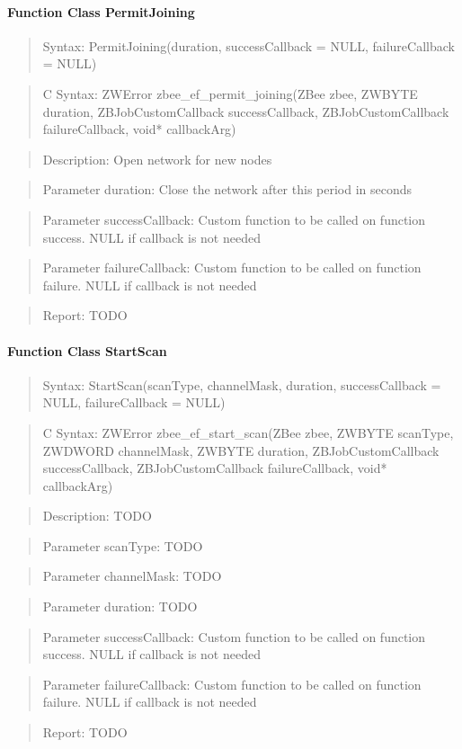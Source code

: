 \paragraph{Function Class PermitJoining}
\begin{quote}Syntax: PermitJoining(duration, successCallback = NULL, failureCallback = NULL)\end{quote}
\begin{quote}C Syntax: ZWError zbee\_ef\_permit\_joining(ZBee zbee, ZWBYTE duration, ZBJobCustomCallback successCallback, ZBJobCustomCallback failureCallback, void* callbackArg)\end{quote}
\begin{quote}Description: Open network for new nodes\end{quote}
\begin{quote}Parameter duration: Close the network after this period in seconds\end{quote}
\begin{quote}Parameter successCallback: Custom function to be called on function success. NULL if callback is not needed\end{quote}
\begin{quote}Parameter failureCallback: Custom function to be called on function failure. NULL if callback is not needed\end{quote}
\begin{quote}Report: TODO\end{quote}

\paragraph{Function Class StartScan}
\begin{quote}Syntax: StartScan(scanType, channelMask, duration, successCallback = NULL, failureCallback = NULL)\end{quote}
\begin{quote}C Syntax: ZWError zbee\_ef\_start\_scan(ZBee zbee, ZWBYTE scanType, ZWDWORD channelMask, ZWBYTE duration, ZBJobCustomCallback successCallback, ZBJobCustomCallback failureCallback, void* callbackArg)\end{quote}
\begin{quote}Description: TODO\end{quote}
\begin{quote}Parameter scanType: TODO\end{quote}
\begin{quote}Parameter channelMask: TODO\end{quote}
\begin{quote}Parameter duration: TODO\end{quote}
\begin{quote}Parameter successCallback: Custom function to be called on function success. NULL if callback is not needed\end{quote}
\begin{quote}Parameter failureCallback: Custom function to be called on function failure. NULL if callback is not needed\end{quote}
\begin{quote}Report: TODO\end{quote}

